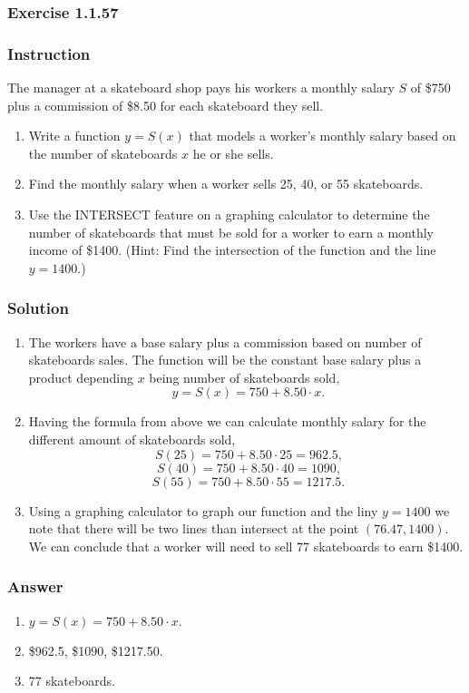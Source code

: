 \subsubsection*{Exercise 1.1.57}

\subsubsection*{Instruction}

The manager at a skateboard shop pays his workers a monthly salary $ S $ of \$750 plus a commission of \$8.50 for each skateboard they sell.

\begin{enumerate}[label = (\alph*)]
  \item
    Write a function $ y = S(x) $ that models a worker’s monthly salary based on the number of skateboards $ x $ he or she sells.
  \item
    Find the monthly salary when a worker sells 25, 40, or 55 skateboards.
  \item
    Use the INTERSECT feature on a graphing calculator to determine the number of skateboards that must be sold for a worker to earn a monthly income of \$1400. (Hint: Find the intersection of the function and the line $ y = 1400 $.)
\end{enumerate}

\subsubsection*{Solution}

\begin{enumerate}[label = (\alph*)]
  \item
    The workers have a base salary plus a commission based on number of skateboards sales. The function will be the constant base salary plus a product depending $ x $ being number of skateboards sold,
    $$ \phantom{.}
    y = S(x) = 750 + 8.50 \cdot x
    .$$
  \item
    Having the formula from above we can calculate monthly salary for the different amount of skateboards sold,
    $$ \phantom{,}
    S(25) = 750 + 8.50 \cdot 25 = 962.5
    ,$$
    $$ \phantom{,}
    S(40) = 750 + 8.50 \cdot 40 = 1090
    ,$$
    $$ \phantom{.}
    S(55) = 750 + 8.50 \cdot 55 = 1217.5
    .$$
  \item
    Using a graphing calculator to graph our function and the liny $ y = 1400 $ we note that there will be two lines than intersect at the point $ (76.47, 1400) $. We can conclude that a worker will need to sell 77 skateboards to earn \$1400.

\end{enumerate}

\subsubsection*{Answer}

\begin{enumerate}[label = (\alph*)]
  \item
    $ y = S(x) = 750 + 8.50 \cdot x. $
  \item
    \$962.5, \$1090, \$1217.50.
  \item
    77 skateboards.
\end{enumerate}
